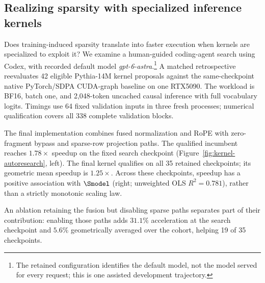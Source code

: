 \subsection{Realizing sparsity with specialized inference kernels}
\label{sec:kernel-autoresearch}

Does training-induced sparsity translate into faster execution when kernels
are specialized to exploit it? We examine a human-guided coding-agent search
using Codex, with recorded default model \emph{gpt-6-astra}.\footnote{The
retained configuration identifies the default model, not the model served
for every request; this is one assisted development trajectory.}
A matched retrospective reevaluates 42 eligible Pythia-14M kernel proposals
against the same-checkpoint native PyTorch/SDPA CUDA-graph baseline on one
RTX5090. The workload is BF16, batch one, and 2,048-token uncached causal
inference with full vocabulary logits. Timings use 64 fixed validation
inputs in three fresh processes; numerical qualification covers all
338 complete validation blocks.

The final implementation combines fused normalization and RoPE with
zero-fragment bypass and sparse-row projection paths.
The qualified incumbent reaches $1.78\times$ speedup on the fixed search
checkpoint (Figure~\ref{fig:kernel-autoresearch}, left). The final kernel
qualifies on all 35 retained checkpoints; its geometric mean speedup is
$1.25\times$. Across these checkpoints, speedup has a positive association
with $\Smodel$ (right; unweighted OLS $R^2=0.781$), rather than a strictly
monotonic scaling law.

An ablation retaining the fusion but disabling sparse paths separates part
of their contribution: enabling those paths adds $31.1\%$ acceleration at
the search checkpoint and $5.6\%$ geometrically averaged over the cohort,
helping 19 of 35 checkpoints.

